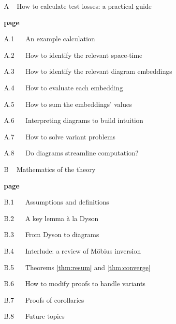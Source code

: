 \documentclass{article}
\theoremstyle{plain}
\theoremstyle{definition}
\begin{document}
    {\bf
    \par\noindent A ~ How to calculate test losses: a practical guide}      \hfill {\bf page \pageref{appendix:tutorial}}
    \par\indent     A.1 ~~ An example calculation                           \hfill \pageref{appendix:example}
    \par\indent     A.2 ~~ How to identify the relevant space-time          \hfill \pageref{appendix:draw-spacetime} 
    \par\indent     A.3 ~~ How to identify the relevant diagram embeddings  \hfill \pageref{appendix:draw-embeddings}
    \par\indent     A.4 ~~ How to evaluate each embedding                   \hfill \pageref{appendix:evaluate-embeddings}
    \par\indent     A.5 ~~ How to sum the embeddings' values                \hfill \pageref{appendix:sum-embeddings}
    \par\indent     A.6 ~~ Interpreting diagrams to build intuition         \hfill \pageref{appendix:interpret-diagrams}
    \par\indent     A.7 ~~ How to solve variant problems                    \hfill \pageref{appendix:solve-variants}
    \par\indent     A.8 ~~ Do diagrams streamline computation?              \hfill \pageref{appendix:diagrams-streamline}

    {\bf
    \par\noindent B ~ Mathematics of the theory}                            \hfill {\bf page \pageref{appendix:math}}
    \par\indent     B.1 ~~ Assumptions and definitions                      \hfill \pageref{appendix:assumptions}
    \par\indent     B.2 ~~ A key lemma \`a la Dyson                         \hfill \pageref{appendix:key-lemma}
    \par\indent     B.3 ~~ From Dyson to diagrams                           \hfill \pageref{appendix:toward-diagrams}
    \par\indent     B.4 ~~ Interlude: a review of M\"obius inversion        \hfill \pageref{appendix:mobius}
    \par\indent     B.5 ~~ Theorems \ref{thm:resum} and \ref{thm:converge}  \hfill \pageref{appendix:resum}
    \par\indent     B.6 ~~ How to modify proofs to handle variants          \hfill \pageref{appendix:prove-variants}
    \par\indent     B.7 ~~ Proofs of corollaries                            \hfill \pageref{appendix:corollaries}
    \par\indent     B.8 ~~ Future topics                                    \hfill \pageref{appendix:future}
\end{document}
